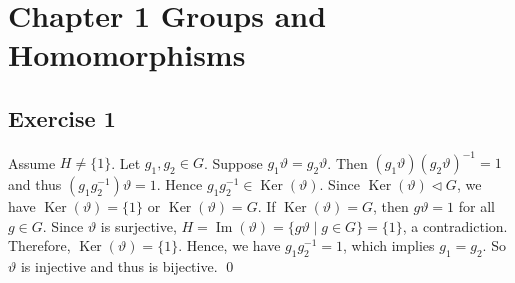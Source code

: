 \documentclass[a4paper, 12pt]{article}
\DeclareMathOperator{\Ker}{Ker}
\DeclareMathOperator{\Image}{Im}
\renewcommand{\Im}{\Image}
\newcommand{\normalsubgroup}{\lhd}
\newcommand{\epf}{\hfill \qed}
\begin{document}
\section*{Chapter 1 Groups and Homomorphisms}

\subsection*{Exercise 1}

Assume $H \neq \{1\}$. Let $g_1, g_2 \in G$. Suppose $g_1\vartheta = g_2\vartheta$. Then $(g_1\vartheta)(g_2\vartheta)^{-1}=1$ and thus $(g_1g_2^{-1})\vartheta=1$. Hence $g_1g_2^{-1} \in \Ker(\vartheta)$. Since $\Ker(\vartheta) \normalsubgroup G$, we have $\Ker(\vartheta) = \{1\}$ or $\Ker(\vartheta) = G$. If $\Ker(\vartheta) = G$, then $g\vartheta=1$ for all $g \in G$. Since $\vartheta$ is surjective, $H = \Im(\vartheta) = \{g\vartheta \mid g \in G\} = \{1\}$, a contradiction. Therefore, $\Ker(\vartheta)=\{1\}$. Hence, we have $g_1g_2^{-1}=1$, which implies $g_1=g_2$. So $\vartheta$ is injective and thus is bijective. \epf
\end{document}
